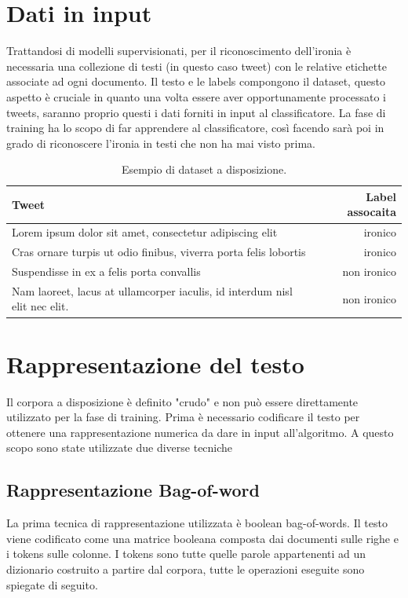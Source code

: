 \documentclass[oneside]{book}
\begin{document}
\clearpage

\section{Dati in input}
Trattandosi di modelli supervisionati, per il riconoscimento dell'ironia è necessaria una collezione di testi (in questo caso tweet) con le relative etichette associate ad ogni documento. Il testo e le labels compongono il dataset, questo aspetto è cruciale in quanto una volta essere aver opportunamente processato i tweets, saranno proprio questi i dati forniti in input al classificatore. La fase di training ha lo scopo di far apprendere al classificatore, così facendo sarà poi in grado di riconoscere l'ironia in testi che non ha mai visto prima.


\begin{table}[h!]
	\centering
	\begin{tabular}[t]{lr}
		\hline
		\textbf{Tweet} & \textbf{Label assocaita}\\
		\hline
		Lorem ipsum dolor sit amet, consectetur adipiscing elit & ironico     \\
		Cras ornare turpis ut odio finibus, viverra porta felis lobortis & ironico \\
		Suspendisse in ex a felis porta convallis & non ironico \\
		Nam laoreet, lacus at ullamcorper iaculis, id interdum nisl elit nec elit. & non ironico \\
		
		\hline
	\end{tabular}
	\caption{Esempio di dataset a disposizione.}
\end{table}%




\section{Rappresentazione del testo}
Il corpora a disposizione è definito "crudo" e non può essere direttamente utilizzato per la fase di training. Prima è necessario codificare il testo per ottenere una rappresentazione numerica da dare in input all'algoritmo. A questo scopo sono state utilizzate due diverse tecniche

\subsection{Rappresentazione Bag-of-word}
La prima tecnica di rappresentazione utilizzata è boolean bag-of-words.
Il testo viene codificato come una matrice booleana composta dai documenti sulle righe e i tokens sulle colonne. I tokens sono tutte quelle parole appartenenti ad un dizionario costruito a partire dal corpora, tutte le operazioni eseguite sono spiegate di seguito.
\end{document}
